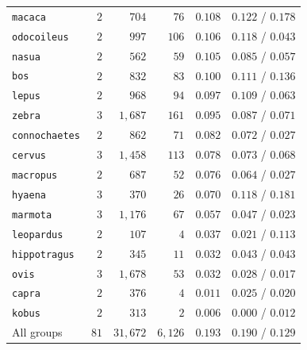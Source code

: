 \begin{table}[htbp]
\begin{tabular}{@{}lrrrrr@{}}
\texttt{macaca} & $2$ & $704$ & $76$ & $0.108$ & $0.122$ / $0.178$ \\
\texttt{odocoileus} & $2$ & $997$ & $106$ & $0.106$ & $0.118$ / $0.043$ \\
\texttt{nasua} & $2$ & $562$ & $59$ & $0.105$ & $0.085$ / $0.057$ \\
\texttt{bos} & $2$ & $832$ & $83$ & $0.100$ & $0.111$ / $0.136$ \\
\texttt{lepus} & $2$ & $968$ & $94$ & $0.097$ & $0.109$ / $0.063$ \\
\texttt{zebra} & $3$ & $1{,}687$ & $161$ & $0.095$ & $0.087$ / $0.071$ \\
\texttt{connochaetes} & $2$ & $862$ & $71$ & $0.082$ & $0.072$ / $0.027$ \\
\texttt{cervus} & $3$ & $1{,}458$ & $113$ & $0.078$ & $0.073$ / $0.068$ \\
\texttt{macropus} & $2$ & $687$ & $52$ & $0.076$ & $0.064$ / $0.027$ \\
\texttt{hyaena} & $3$ & $370$ & $26$ & $0.070$ & $0.118$ / $0.181$ \\
\texttt{marmota} & $3$ & $1{,}176$ & $67$ & $0.057$ & $0.047$ / $0.023$ \\
\texttt{leopardus} & $2$ & $107$ & $4$ & $0.037$ & $0.021$ / $0.113$ \\
\texttt{hippotragus} & $2$ & $345$ & $11$ & $0.032$ & $0.043$ / $0.043$ \\
\texttt{ovis} & $3$ & $1{,}678$ & $53$ & $0.032$ & $0.028$ / $0.017$ \\
\texttt{capra} & $2$ & $376$ & $4$ & $0.011$ & $0.025$ / $0.020$ \\
\texttt{kobus} & $2$ & $313$ & $2$ & $0.006$ & $0.000$ / $0.012$ \\
\midrule
All groups & $81$ & $31{,}672$ & $6{,}126$ & $0.193$ & $0.190$ / $0.129$ \\
\bottomrule
\end{tabular}
\end{table}

